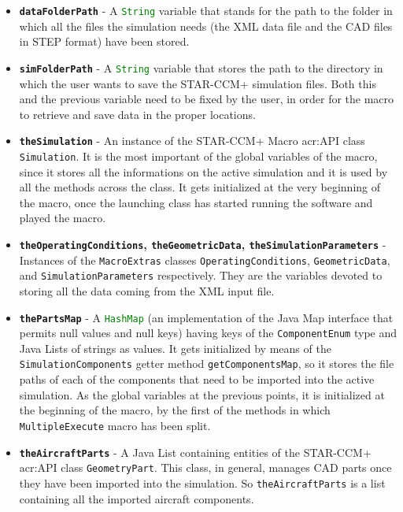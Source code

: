 \begin{itemize}
\renewcommand\labelitemi{\tiny$\blacksquare$}
\renewcommand\labelitemii{\tiny$\bullet$}
\item \textbf{\lstinline[language=Java]!dataFolderPath!} - A \lstinline[language=Java]!String! variable that stands for the path to the folder in which all the files the simulation needs (the XML data file and the \gls{CAD} files in STEP format) have been stored.
\item \textbf{\lstinline[language=Java]!simFolderPath!} - A \lstinline[language=Java]!String! variable that stores the path to the directory in which the user wants to save the STAR-CCM+ simulation files. Both this and the previous variable need to be fixed by the user, in order for the macro to retrieve and save data in the proper locations.
\item \textbf{\lstinline[language=Java]!theSimulation!} - An instance of the STAR-CCM+ Macro \gls{acr:API} class \lstinline[language=Java]!Simulation!. It is the most important of the global variables of the macro, since it stores all the informations on the active simulation and it is used by all the methods across the class. It gets initialized at the very beginning of the macro, once the launching class has started running the software and played the macro.
\item \textbf{\lstinline[language=Java]!theOperatingConditions!, \lstinline[language=Java]!theGeometricData!, \lstinline[language=Java]!theSimulationParameters!} - Instances of the \lstinline[language=Java]!MacroExtras! classes \lstinline[language=Java]!OperatingConditions!, \lstinline[language=Java]!GeometricData!, and \lstinline[language=Java]!SimulationParameters! respectively. They are the variables devoted to storing all the data coming from the XML input file.
\item \textbf{\lstinline[language=Java]!thePartsMap!} - A \lstinline[language=Java]!HashMap! (an implementation of the Java \gls{Map} interface that permits null values and null keys) having keys of the \lstinline[language=Java]!ComponentEnum! type and Java \gls{List}s of strings as values. It gets initialized by means of the \lstinline[language=Java]!SimulationComponents! getter method \lstinline[language=Java]!getComponentsMap!, so it stores the file paths of each of the components that need to be imported into the active simulation. As the global variables at the previous points, it is initialized at the beginning of the macro, by the first of the methods in which \lstinline[language=Java]!MultipleExecute! macro has been split.
\item \textbf{\lstinline[language=Java]!theAircraftParts!} - A Java \gls{List} containing entities of the STAR-CCM+ \gls{acr:API} class \lstinline[language=Java]!GeometryPart!. This class, in general, manages \gls{CAD} parts once they have been imported into the simulation. So \lstinline[language=Java]!theAircraftParts! is a list containing all the imported aircraft components.
\end{itemize}
